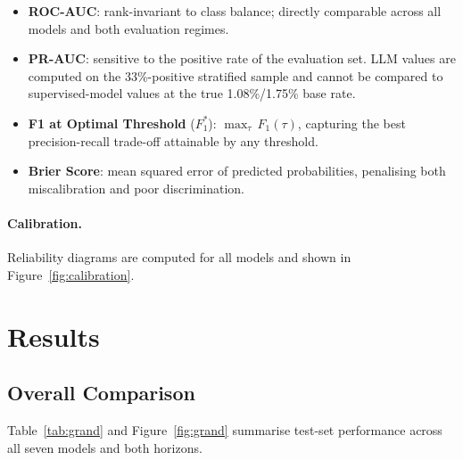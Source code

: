 \documentclass[12pt,a4paper]{article}
\begin{document}
\begin{itemize}[noitemsep]
    \item \textbf{ROC-AUC}: rank-invariant to class balance; directly
    comparable across all models and both evaluation regimes.
    \item \textbf{PR-AUC}: sensitive to the positive rate of the evaluation
    set.  LLM values are computed on the 33\%-positive stratified sample and
    cannot be compared to supervised-model values at the true 1.08\%/1.75\%
    base rate.
    \item \textbf{F1 at Optimal Threshold} ($F_1^*$):
    $\max_{\tau}\,F_1(\tau)$, capturing the best precision-recall trade-off
    attainable by any threshold.
    \item \textbf{Brier Score}: mean squared error of predicted probabilities,
    penalising both miscalibration and poor discrimination.
\end{itemize}

\paragraph{Calibration.}
Reliability diagrams are computed for all models and shown in
Figure~\ref{fig:calibration}.

\clearpage

\section{Results}
\label{sec:results}

\subsection{Overall Comparison}

Table~\ref{tab:grand} and Figure~\ref{fig:grand} summarise test-set
performance across all seven models and both horizons.
\end{document}
